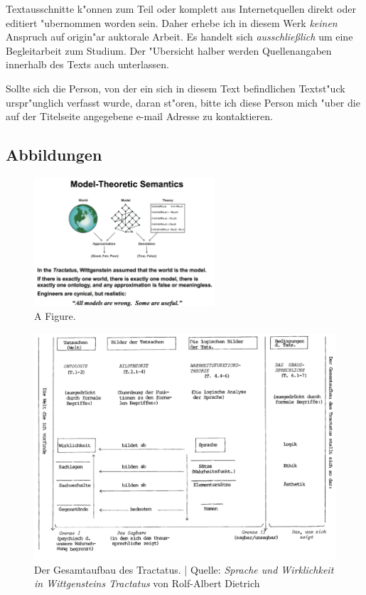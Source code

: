 \documentclass[emulatestandardclasses]{scrartcl}
\begin{document}
Textausschnitte k"onnen zum Teil oder komplett aus Internetquellen direkt oder editiert "ubernommen worden sein. Daher erhebe ich in diesem Werk \emph{keinen} Anspruch auf origin"ar auktorale Arbeit. Es handelt sich \emph{ausschlie\ss lich} um eine Begleitarbeit zum Studium. Der "Ubersicht halber werden Quellenangaben innerhalb des Texts auch unterlassen. 

Sollte sich die Person, von der ein sich in diesem Text befindlichen Textst"uck urspr"unglich verfasst wurde, daran st"oren, bitte ich diese Person mich "uber die auf der Titelseite angegebene e-mail Adresse zu kontaktieren.
\subsection{Abbildungen}

\begin{figure}[h]
	\centering
	\includegraphics[width=0.6\textwidth]{images/tractatus/semantics.png}
	\caption{A Figure.}
	\label{fig:sem}
\end{figure}
\begin{figure}[h]
	\centering
	\includegraphics[width=1\textwidth]{images/tractatus/tractatus-structur.png}
	\caption{Der Gesamtaufbau des Tractatus. | Quelle: \emph{Sprache und Wirklichkeit in Wittgensteins Tractatus} von Rolf-Albert Dietrich}
	\label{fig:struct}
\end{figure}
\end{document}

